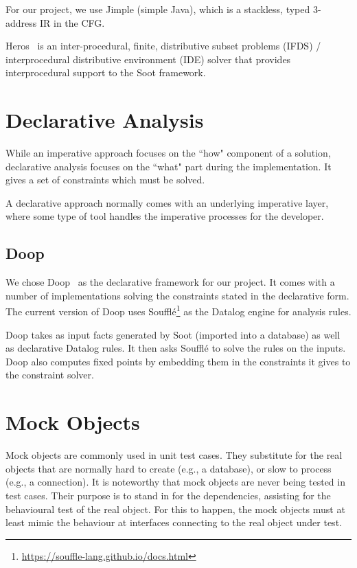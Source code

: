 For our project, we use Jimple (simple Java), which is a stackless, typed 3-address IR in the CFG.

Heros~\cite{bodden12:_inter_proced_data_flow_analy} is an inter-procedural, finite, distributive subset problems (IFDS) / interprocedural distributive environment (IDE) solver that provides interprocedural support to the Soot framework.

\section{Declarative Analysis}

While an imperative approach focuses on the ``how" component of a solution, declarative analysis focuses on the ``what" part during the implementation. It gives a set of constraints which must be solved.

A declarative approach normally comes with an underlying imperative layer, where some type of tool handles the imperative processes for the developer.

\subsection{Doop}

We chose Doop~\cite{bravenboer09:_stric_declar_specif_sophis_point_analy} as the declarative framework for our project. It comes with a number of implementations solving the constraints stated in the declarative form. The current version of Doop uses Soufflé\footnote{\url{https://souffle-lang.github.io/docs.html}} as the Datalog engine for analysis rules.

Doop takes as input facts generated by Soot (imported into a database) as well as declarative Datalog rules. It then asks Soufflé to solve the rules on the inputs. Doop also computes fixed points by embedding them in the constraints it gives to the constraint solver.


\section{Mock Objects} 

Mock objects are commonly used in unit test cases. They substitute for the real objects that are normally hard to create (e.g., a database), or slow to process (e.g., a connection). It is noteworthy that mock objects are never being tested in test cases. Their purpose is to stand in for the dependencies, assisting for the behavioural test of the real object. For this to happen, the mock objects must at least mimic the behaviour at interfaces connecting to the real object under test.

